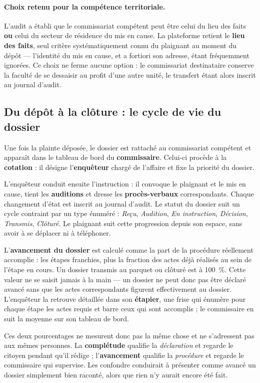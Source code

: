 \paragraph{Choix retenu pour la compétence territoriale.} L'audit a établi que le commissariat compétent peut être celui du lieu des faits \textbf{ou} celui du secteur de résidence du mis en cause. La plateforme retient le \textbf{lieu des faits}, seul critère systématiquement connu du plaignant au moment du dépôt — l'identité du mis en cause, et a fortiori son adresse, étant fréquemment ignorées. Ce choix ne ferme aucune option : le commissariat destinataire conserve la faculté de se dessaisir au profit d'une autre unité, le transfert étant alors inscrit au journal d'audit.

\subsection{Du dépôt à la clôture : le cycle de vie du dossier}

Une fois la plainte déposée, le dossier est rattaché au commissariat compétent et apparaît dans le tableau de bord du \textbf{commissaire}. Celui-ci procède à la \textbf{cotation} : il désigne l'\textbf{enquêteur} chargé de l'affaire et fixe la priorité du dossier.

L'enquêteur conduit ensuite l'instruction : il convoque le plaignant et le mis en cause, tient les \textbf{auditions} et dresse les \textbf{procès-verbaux} correspondants. Chaque changement d'état est inscrit au journal d'audit. Le statut du dossier suit un cycle contraint par un type énuméré : \textit{Reçu}, \textit{Audition}, \textit{En instruction}, \textit{Décision}, \textit{Transmis}, \textit{Clôturé}. Le plaignant suit cette progression depuis son espace, sans avoir à se déplacer ni à téléphoner.

L'\textbf{avancement du dossier} est calculé comme la part de la procédure réellement accomplie : les étapes franchies, plus la fraction des actes déjà réalisés au sein de l'étape en cours. Un dossier transmis au parquet ou clôturé est à 100~\%. Cette valeur ne se saisit jamais à la main — un dossier ne peut donc pas être déclaré avancé sans que les actes correspondants figurent effectivement au dossier. L'enquêteur la retrouve détaillée dans son \textbf{étapier}, une frise qui énumère pour chaque étape les actes requis et barre ceux qui sont accomplis ; le commissaire en suit la moyenne sur son tableau de bord.

Ces deux pourcentages ne mesurent donc pas la même chose et ne s'adressent pas aux mêmes personnes. La \textbf{complétude} qualifie la \textit{déclaration} et regarde le citoyen pendant qu'il rédige ; l'\textbf{avancement} qualifie la \textit{procédure} et regarde le commissaire qui supervise. Les confondre conduirait à présenter comme avancé un dossier simplement bien raconté, alors que rien n'y aurait encore été fait.

